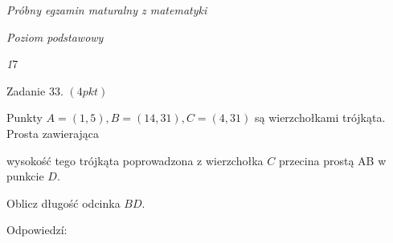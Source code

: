 \documentclass[a4paper,12pt]{article}
\begin{document}
{\it Próbny egzamin maturalny z matematyki}

{\it Poziom podstawowy}

{\it 1}7

Zadanie 33. $(4pkt)$

Punkty $A=(1,5), B=(14,31), C=(4,31)$ są wierzchołkami trójkąta. Prosta zawierająca

wysokość tego trójkąta poprowadzona z wierzchołka $C$ przecina prostą AB w punkcie $D.$

Oblicz długość odcinka $BD.$

Odpowiedzí:
\end{document}
